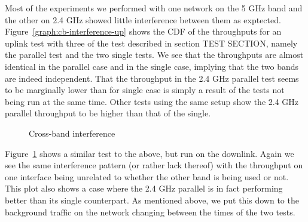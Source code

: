 Most of the experiments we performed with one network on the 5 GHz band and the
other on 2.4 GHz showed little interference between them as exptected.
Figure~\ref{graph:cb-interference-up} shows the CDF of the throughputs for an
uplink test with three of the test described in section TEST SECTION, namely   %
the parallel test and the two single tests. We see that the throughputs are
almost identical in the parallel case and in the single case, implying that the
two bands are indeed independent. That the throughput in the 2.4 GHz parallel
test seems to be marginally lower than for single case is simply a result of the
tests not being run at the same time. Other tests using the same setup show the
2.4 GHz parallel throughput to be higher than that of the single.

\begin{figure}[h]
 \centering
 
 \caption{Cross-band interference}\label{graph:cb-interference-down}
\end{figure}

Figure~\ref{graph:cb-interference-down} shows a similar test to the above, but
run on the downlink. Again we see the same interference pattern (or rather lack
thereof) with the throughput on one interface being unrelated to whether the
other band is being used or not. This plot also shows a case where the 2.4 GHz
parallel is in fact performing better than its single counterpart. As mentioned
above, we put this down to the background traffic on the network changing
between the times of the two tests.

